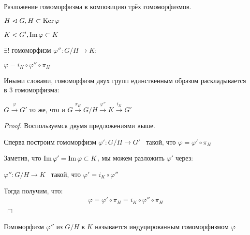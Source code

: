 \begin{theorem-non}
    Разложение гомоморфизма в композицию трёх гомоморфизмов.

    $H \vartriangleleft G, H \subset \operatorname{Ker} \varphi$

    $K < G', \operatorname{Im} \varphi \subset K$

    $\exists !$ гомоморфизм $\varphi'': G / H \to K:$

    $\varphi =  i_K \circ \varphi'' \circ \pi_H$

    Иными словами, гомоморфизм двух групп единственным образом раскладывается в 3 гомоморфизма:

    $G \stackrel{\varphi}{\to} G'$ то же, что и $G \stackrel{\pi_{H}}{\to} G/H \stackrel{\varphi''}{\to} K \stackrel{i_{K}}{\to} G'$

    \begin{proof}
        Воспользуемся двумя предложениями выше.

        Сперва построим гомоморфизм $\varphi': G / H \to G'$ \, такой, что $\varphi = \varphi' \circ \pi_H$

        Заметив, что $\operatorname{Im} \varphi' = \operatorname{Im} \varphi \subset K$, мы можем разложить $\varphi'$ через:

        $\varphi'': G / H \to K$ \, такой, что $\varphi' = i_K \circ \varphi''$

        Тогда получим, что: 
        \begin{gather*}
            \varphi = \varphi' \circ \pi_H = i_K \circ \varphi'' \circ \pi_H
        \end{gather*}
    \end{proof}

    \notice Гомоморфизм $\varphi''$ из $G / H$ в $K$ называется индуцированным гомоморфизмом $\varphi$
\end{theorem-non}
